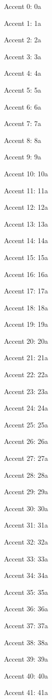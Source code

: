 Accent 0: \accent0a

Accent 1: \accent1a

Accent 2: \accent2a

Accent 3: \accent3a

Accent 4: \accent4a

Accent 5: \accent5a

Accent 6: \accent6a

Accent 7: \accent7a

Accent 8: \accent8a

Accent 9: \accent9a

Accent 10: \accent10a

Accent 11: \accent11a

Accent 12: \accent12a

Accent 13: \accent13a

Accent 14: \accent14a

Accent 15: \accent15a

Accent 16: \accent16a

Accent 17: \accent17a

Accent 18: \accent18a

Accent 19: \accent19a

Accent 20: \accent20a

Accent 21: \accent21a

Accent 22: \accent22a

Accent 23: \accent23a

Accent 24: \accent24a

Accent 25: \accent25a

Accent 26: \accent26a

Accent 27: \accent27a

Accent 28: \accent28a

Accent 29: \accent29a

Accent 30: \accent30a

Accent 31: \accent31a

Accent 32: \accent32a

Accent 33: \accent33a

Accent 34: \accent34a

Accent 35: \accent35a

Accent 36: \accent36a

Accent 37: \accent37a

Accent 38: \accent38a

Accent 39: \accent39a

Accent 40: \accent40a

Accent 41: \accent41a

